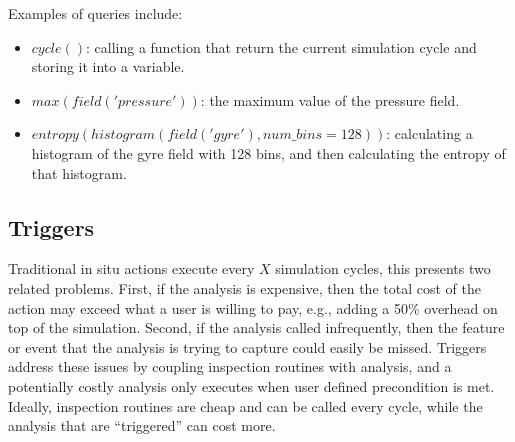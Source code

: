 Examples of queries include:
\begin{itemize}
\item $cycle()$: calling a function that return the current simulation cycle and storing it into a variable.
\item $max(field('pressure'))$: the maximum value of the pressure field.
\item $entropy(histogram(field('gyre'), num\_bins=128))$: calculating a histogram of the gyre field with 128 bins, and then calculating the entropy of that histogram.
\end{itemize}
%

%
%

\subsection{Triggers}
\label{sec:ascent:triggers}
Traditional in situ actions execute every $X$ simulation cycles, this presents
two related problems.
%
First, if the analysis is expensive, then the total cost of the action may exceed
what a user is willing to pay, e.g., adding a 50\% overhead on top of the simulation.
%
Second, if the analysis called infrequently, then the feature or event that the analysis is
trying to capture could easily be missed.
%
Triggers address these issues by coupling inspection routines with analysis, and a
potentially costly analysis only executes when user defined precondition is met.
%
Ideally, inspection routines are cheap and can be called every cycle, while the analysis
that are ``triggered'' can cost more.

